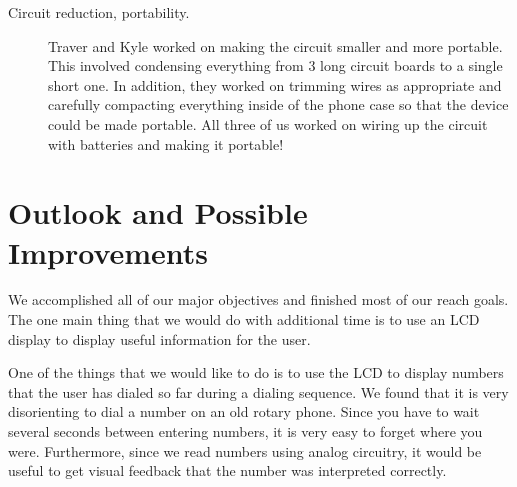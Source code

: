 \documentclass{es50report}
\begin{document}
\begin{description}
            \item[Circuit reduction, portability.]
                Traver and Kyle worked on making the circuit smaller and more portable. This involved condensing everything from 3 long circuit boards to a single short one. In addition, they worked on trimming wires as appropriate and carefully compacting everything inside of the phone case so that the device could be made portable. All three of us worked on wiring up the circuit with batteries and making it portable!
        \end{description}

    \section{Outlook and Possible Improvements}
        \begin{description}
            \setlength{\parskip}{2mm}
            \item[LCD display.]
                We accomplished all of our major objectives and finished most of our reach goals. The one main thing that we would do with additional time is to use an LCD display to display useful information for the user.

                One of the things that we would like to do is to use  the LCD to display numbers that the user has dialed so far during a dialing sequence. We found that it is very disorienting to dial a number on an old rotary phone. Since you have to wait several seconds between entering numbers, it is very easy to forget where you were. Furthermore, since we read numbers using analog circuitry, it would be useful to get visual feedback that the number was interpreted correctly.


\end{description}
\end{document}
